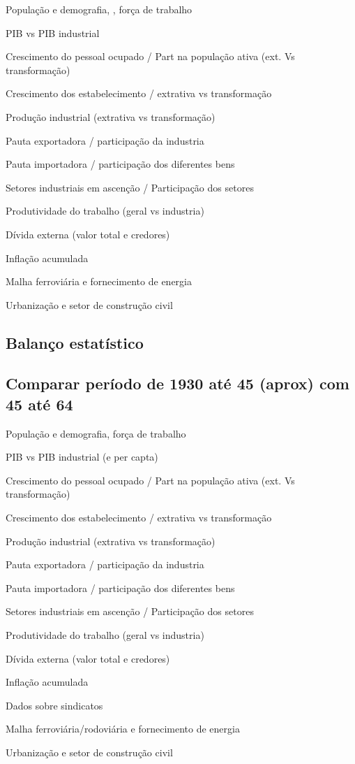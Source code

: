 \begin{esboco}
População e demografia, , força de trabalho

PIB vs PIB industrial

Crescimento do pessoal ocupado / Part na população ativa (ext. Vs
transformação)

Crescimento dos estabelecimento / extrativa vs transformação

Produção industrial (extrativa vs transformação)

Pauta exportadora / participação da industria

Pauta importadora / participação dos diferentes bens

Setores industriais em ascenção / Participação dos setores

Produtividade do trabalho (geral vs industria)

Dívida externa (valor total e credores)

Inflação acumulada

Malha ferroviária e fornecimento de energia

Urbanização e setor de construção civil
\end{esboco}

\subsection{Balanço estatístico}\label{balanuxe7o-estatuxedstico}

\subsection{Comparar período de 1930 até 45 (aprox) com 45 até 64}\label{comparar-peruxedodo-de-1930-atuxe9-45-aprox-com-45-atuxe9-64}

\begin{esboco}
População e demografia, força de trabalho

PIB vs PIB industrial (e per capta)

Crescimento do pessoal ocupado / Part na população ativa (ext. Vs
transformação)

Crescimento dos estabelecimento / extrativa vs transformação

Produção industrial (extrativa vs transformação)

Pauta exportadora / participação da industria

Pauta importadora / participação dos diferentes bens

Setores industriais em ascenção / Participação dos setores

Produtividade do trabalho (geral vs industria)

Dívida externa (valor total e credores)

Inflação acumulada

Dados sobre sindicatos

Malha ferroviária/rodoviária e fornecimento de energia

Urbanização e setor de construção civil
\end{esboco}

